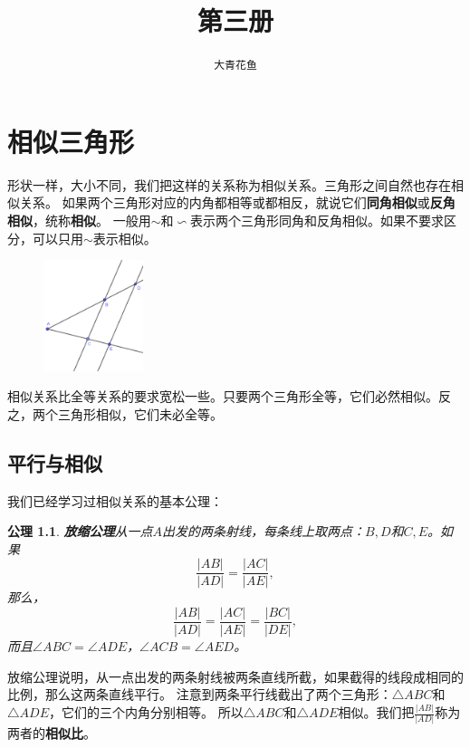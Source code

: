 \documentclass[12pt,UTF8]{ctexbook}
\title{\zihao{0} \bfseries 第三册}
\author{\zihao{2} \texttt{大青花鱼}}
\date{}
\newtheorem{po}{公理}
\begin{document}
\maketitle
\tableofcontents
\newpage

\chapter{相似三角形}
形状一样，大小不同，我们把这样的关系称为相似关系。三角形之间自然也存在相似关系。
如果两个三角形对应的内角都相等或都相反，就说它们\textbf{同角相似}或\textbf{反角相似}，统称\textbf{相似}。
一般用$\sim$和$\backsim$表示两个三角形同角和反角相似。如果不要求区分，可以只用$\sim$表示相似。

\begin{figure} %
    \vspace{-26pt}
    \includegraphics[width=0.26\textwidth]{比例1.png}
\end{figure}

相似关系比全等关系的要求宽松一些。只要两个三角形全等，它们必然相似。反之，两个三角形相似，它们未必全等。

\section{平行与相似}
我们已经学习过相似关系的基本公理：
\begin{po}{\textbf{放缩公理}}\label{po:6}
    从一点$A$出发的两条射线，每条线上取两点：$B,D$和$C,E$。如果
    $$ \frac{|AB|}{|AD|} = \frac{|AC|}{|AE|},$$
    那么，
    $$ \frac{|AB|}{|AD|} = \frac{|AC|}{|AE|} = \frac{|BC|}{|DE|},$$
    而且$\angle ABC = \angle ADE$，$\angle ACB = \angle AED$。
\end{po}

放缩公理说明，从一点出发的两条射线被两条直线所截，如果截得的线段成相同的比例，那么这两条直线平行。
注意到两条平行线截出了两个三角形：$\triangle ABC$和$\triangle ADE$，它们的三个内角分别相等。
所以$\triangle ABC$和$\triangle ADE$相似。我们把$\frac{|AB|}{|AD|}$称为两者的\textbf{相似比}。

\end{document}
